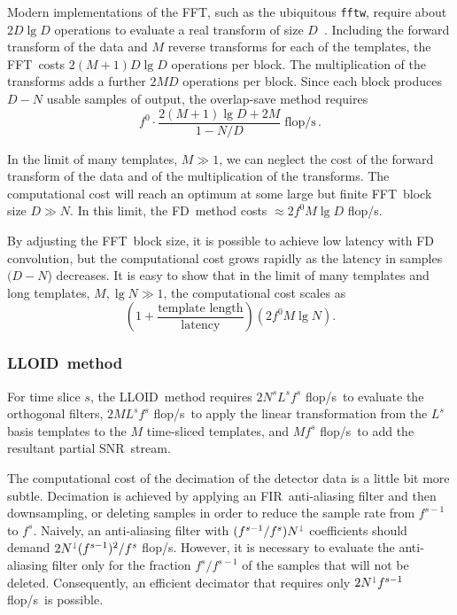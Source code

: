 \documentclass[preprint2]{aastex}
\newcommand{\SNR}{SNR}%
\newcommand{\tmpsamps}{\ensuremath{N}}
\newcommand{\numtmps}{\ensuremath{M}}
\newcommand{\svdtmps}[1]{\ensuremath{L^#1}}
\newcommand{\numsvdtmps}{\svdtmps{s}}
\newcommand{\slicesamps}[1]{\ensuremath{N^#1}}
\newcommand{\slicessamps}{\slicesamps{s}}
\newcommand{\fftblock}{\ensuremath{D}}
\newcommand{\fir}{FIR}%
\newcommand{\fft}{FFT}%
\newcommand{\flops}{flop/s}
\newcommand{\lloid}{LLOID}%
\newcommand{\FD}{FD}%
\begin{document}
Modern implementations of the \fft, such as the ubiquitous \texttt{fftw}, require about
$2 \fftblock \lg \fftblock$ operations to evaluate a real transform of size
$\fftblock$~\citep{Johnson:2007p9654}.  Including the forward transform of the data and
$M$ reverse transforms for each of the templates, the \fft\ costs $2 (\numtmps + 1)
\fftblock \lg \fftblock$ operations per block.  The multiplication of the transforms adds
a further $2 \numtmps \fftblock$ operations per block.  Since each block produces
$\fftblock - \tmpsamps$ usable samples of output, the overlap-save method requires
$$
f^0 \cdot \frac{2 (\numtmps + 1) \lg \fftblock + 2 \numtmps}{1 - \tmpsamps/\fftblock} \; \mathrm{\flops} \,.
$$

In the limit of many templates, $M \gg 1$, we can neglect the cost of the forward
transform of the data and of the multiplication of the transforms.  The computational
cost will reach an optimum at some large but finite \fft\ block size
$\fftblock \gg \tmpsamps$.  In this limit, the \FD\ method costs
$\approx 2 f^0 \numtmps \lg \fftblock$ \flops.

By adjusting the \fft\ block size, it is possible to achieve low latency with FD
convolution, but the computational cost grows rapidly as the latency in samples
$(D-N$) decreases.  It is easy to show that in the limit of many templates and
long templates, $M, \lg N \gg 1$, the computational cost scales as
%
$$
\left(1 + \frac{\textrm{template length}}{\textrm{latency}}\right) \left( 2 f^0 M \lg N \right).
$$

\subsubsection{\label{sec:lloid-method}\lloid\ method}

For time slice $s$, the \lloid\ method requires $2 \slicessamps \numsvdtmps f^s$ \flops\ 
to evaluate the orthogonal filters, $2 \numtmps \numsvdtmps f^s$ \flops\ to
apply the  linear transformation from the $\numsvdtmps$ basis templates to the
$\numtmps$ time-sliced templates, and $\numtmps f^s$ \flops\ to add the
resultant partial \SNR\ stream.

The computational cost of the decimation of the detector data is a little bit
more subtle.  Decimation is achieved by applying an \fir\ anti-aliasing filter
and then downsampling, or deleting samples in order to reduce the sample rate
from $f^{s-1}$ to $f^s$.  Naively, an anti-aliasing filter with
$(f^{s-1} / f^s) N^\shortdownarrow$ coefficients should demand
$2 N^\shortdownarrow (f^{s-1})^2 / f^s$ \flops.  However, it is necessary to
evaluate the anti-aliasing filter only for the fraction $f^s / f^{s-1}$ of the
samples that will not be deleted.  Consequently, an efficient decimator that
requires only $2 N^\shortdownarrow f^{s-1}$ \flops\ is possible.
\end{document}
